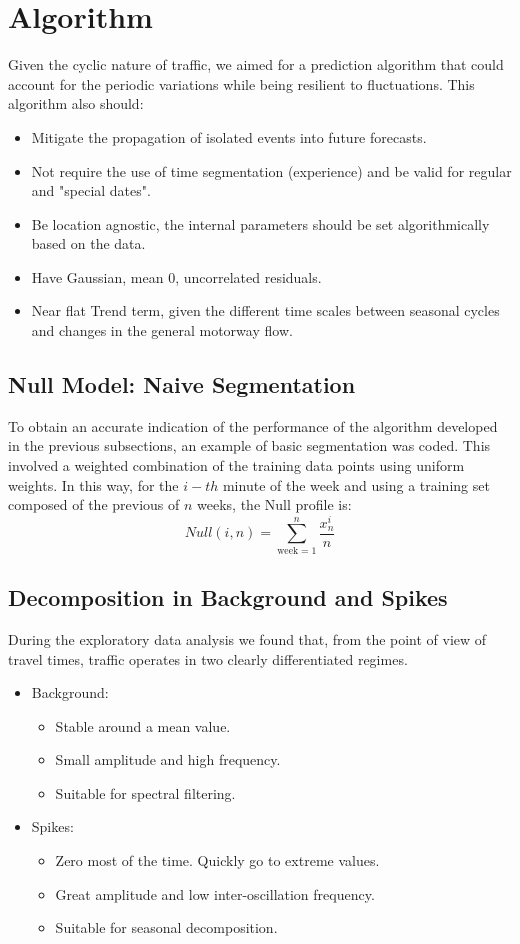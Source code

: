 \documentclass[conference]{IEEEtran}
\begin{document}
\section{Algorithm} \label{algorithm}
Given the cyclic nature of traffic, we aimed for a prediction algorithm that could account for the periodic variations while being resilient to fluctuations. 
This algorithm also should:
\begin{itemize}
	\item Mitigate the propagation of isolated events into future forecasts.
	\item Not require the use of time segmentation (experience) and be valid for regular and "special dates".
	\item Be location agnostic, the internal parameters should be set algorithmically based on the data.
	\item Have Gaussian, mean 0, uncorrelated residuals.
	\item Near flat Trend term, given the different time scales between seasonal cycles and changes in the general motorway flow.
\end{itemize}

\subsection{Null Model: Naive Segmentation}
To obtain an accurate indication of the performance of the algorithm developed in the previous subsections, an example of basic segmentation was coded. 
This involved a weighted combination of the training data points using uniform weights. 
In this way, for the $i-th$ minute of the week and using a training set composed of the previous of $n$ weeks, the Null profile is:
\begin{equation}
Null(i,n) = \sum_{\textrm{week}=1}^{n} \frac{x^i_n}{n} 
\end{equation}

\subsection{Decomposition in Background and Spikes}
During the exploratory data analysis we found that, from the point of view of travel times, traffic operates in two clearly differentiated regimes. 
\begin{itemize}
	\item Background: 
	\begin{itemize}
		\item Stable around a mean value.
		\item Small amplitude and high frequency.
		\item Suitable for spectral filtering.
	\end{itemize}
	\item Spikes: 
	\begin{itemize}
		\item Zero most of the time. Quickly go to extreme values.
		\item Great amplitude and low inter-oscillation frequency.
		\item Suitable for seasonal decomposition.
	\end{itemize}
\end{itemize}
\end{document}
